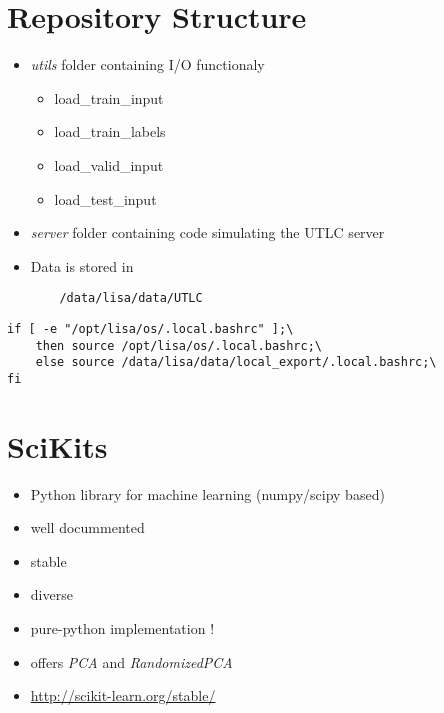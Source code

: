 \documentclass[9pt]{beamer}
\begin{document}
\section{Repository Structure}
\begin{frame}
 \begin{itemize}
    \item \emph{utils} folder containing I/O functionaly
        \begin{itemize}
            \item load\_train\_input
            \item load\_train\_labels
            \item load\_valid\_input
            \item load\_test\_input
        \end{itemize}
    \item \emph{server} folder containing code simulating the UTLC server
 \end{itemize}
 \end{frame}

\begin{frame}[fragile]
 \begin{itemize}
    \item Data is stored in 
    \begin{verbatim}
    /data/lisa/data/UTLC
    \end{verbatim}
 \end{itemize}
    
    \begin{verbatim}
if [ -e "/opt/lisa/os/.local.bashrc" ];\
    then source /opt/lisa/os/.local.bashrc;\
    else source /data/lisa/data/local_export/.local.bashrc;\
fi
    \end{verbatim}
\end{frame}

\section{SciKits}
\begin{frame}
 \begin{itemize}
    \item Python library for machine learning (numpy/scipy based)
    \item well docummented 
    \item stable
    \item diverse
    \item pure-python implementation !
    \item offers \emph{PCA} and \emph{RandomizedPCA}
    \item \url{http://scikit-learn.org/stable/}
 \end{itemize}
\end{frame}
\end{document}
